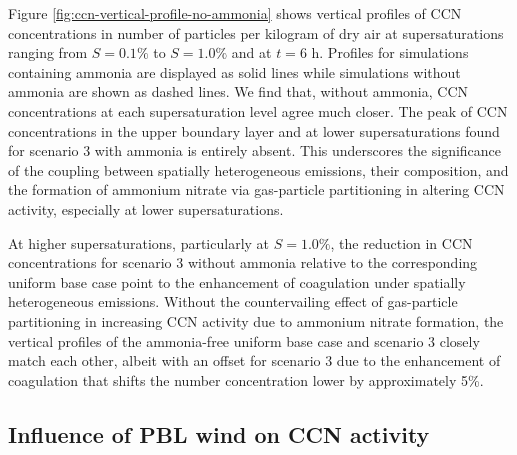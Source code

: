 \documentclass[journal abbreviation, manuscript]{copernicus}
\begin{document}
Figure \ref{fig:ccn-vertical-profile-no-ammonia} shows vertical profiles of CCN concentrations in number of particles per kilogram of dry air at supersaturations ranging from $S=0.1\%$ to $S=1.0\%$ and at $t=6$ h. Profiles for simulations containing ammonia are displayed as solid lines while simulations without ammonia are shown as dashed lines. We find that, without ammonia, CCN concentrations at each supersaturation level agree much closer. The peak of CCN concentrations in the upper boundary layer and at lower supersaturations found for scenario 3 with ammonia is entirely absent. This underscores the significance of the coupling between spatially heterogeneous emissions, their composition, and the formation of ammonium nitrate via gas-particle partitioning in altering CCN activity, especially at lower supersaturations. 

At higher supersaturations, particularly at $S=1.0\%$, the reduction in CCN concentrations for scenario 3 without ammonia relative to the corresponding uniform base case point to the enhancement of coagulation under spatially heterogeneous emissions. Without the countervailing effect of gas-particle partitioning in increasing CCN activity due to ammonium nitrate formation, the vertical profiles of the ammonia-free uniform base case and scenario 3 closely match each other, albeit with an offset for scenario 3 due to the enhancement of coagulation that shifts the number concentration lower by approximately 5\%.  

\subsection{Influence of PBL wind on CCN activity}\label{sec:influence-wind}

\conclusions  %

\end{document}
